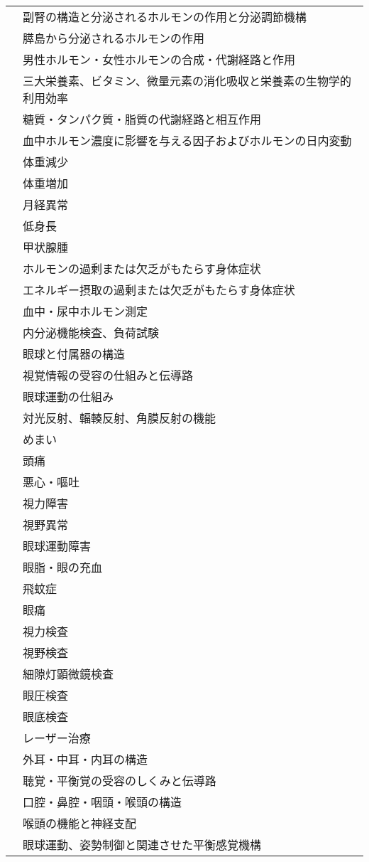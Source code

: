 \begin{xltabular}{\linewidth}{XX}
 & 副腎の構造と分泌されるホルモンの作用と分泌調節機構 \\
 & 膵島から分泌されるホルモンの作用 \\
 & 男性ホルモン・女性ホルモンの合成・代謝経路と作用 \\
 & 三大栄養素、ビタミン、微量元素の消化吸収と栄養素の生物学的利用効率 \\
 & 糖質・タンパク質・脂質の代謝経路と相互作用 \\
 & 血中ホルモン濃度に影響を与える因子およびホルモンの日内変動 \\
 & 体重減少 \\
 & 体重増加 \\
 & 月経異常 \\
 & 低身長 \\
 & 甲状腺腫 \\
 & ホルモンの過剰または欠乏がもたらす身体症状 \\
 & エネルギー摂取の過剰または欠乏がもたらす身体症状 \\
 & 血中・尿中ホルモン測定 \\
 & 内分泌機能検査、負荷試験 \\
 & 眼球と付属器の構造 \\
 & 視覚情報の受容の仕組みと伝導路 \\
 & 眼球運動の仕組み \\
 & 対光反射、輻輳反射、角膜反射の機能 \\
 & めまい \\
 & 頭痛 \\
 & 悪心・嘔吐 \\
 & 視力障害 \\
 & 視野異常 \\
 & 眼球運動障害 \\
 & 眼脂・眼の充血 \\
 & 飛蚊症 \\
 & 眼痛 \\
 & 視力検査 \\
 & 視野検査 \\
 & 細隙灯顕微鏡検査 \\
 & 眼圧検査 \\
 & 眼底検査 \\
 & レーザー治療 \\
 & 外耳・中耳・内耳の構造 \\
 & 聴覚・平衡覚の受容のしくみと伝導路 \\
 & 口腔・鼻腔・咽頭・喉頭の構造 \\
 & 喉頭の機能と神経支配 \\
 & 眼球運動、姿勢制御と関連させた平衡感覚機構 \\

\end{xltabular}
